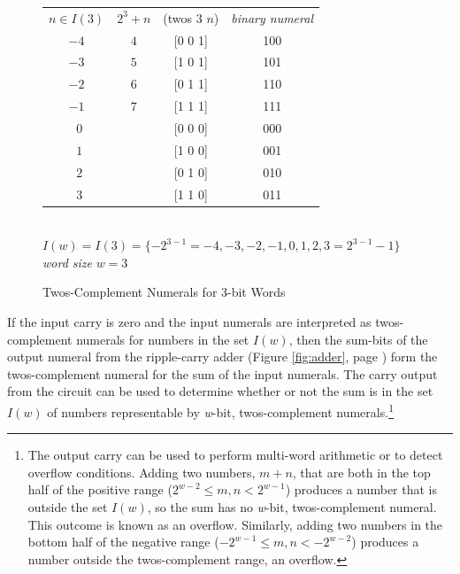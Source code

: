 \begin{figure}
\begin{center}
\begin{tabular}{cccc}
 $n \in I(3)$ & $2^3+n$  & (twos $3$ $n$)   & \emph{binary numeral} \\
 $-4$         & $4$      & [0 0 1]          & 100                   \\
 $-3$         & $5$      & [1 0 1]          & 101                   \\
 $-2$         & $6$      & [0 1 1]          & 110                   \\
 $-1$         & $7$      & [1 1 1]          & 111                   \\
 $~~0$        &          & [0 0 0]          & 000                   \\
 $~~1$        &          & [1 0 0]          & 001                   \\
 $~~2$        &          & [0 1 0]          & 010                   \\
 $~~3$        &          & [1 1 0]          & 011                   \\
\end{tabular}
\\ $I(w) = I(3) = \{-2^{3-1}=-4, -3, -2, -1, 0, 1, 2, 3=2^{3-1}-1\}$
\\ \emph{word size} $w = 3$
\end{center}
\caption{Twos-Complement Numerals for 3-bit Words}
\label{fig:2s-comp-3bit}
\end{figure}

If the input carry is zero and
the input numerals are interpreted
as twos-complement numerals for numbers in the set $I(w)$,
then the sum-bits of the output numeral from the ripple-carry adder
(Figure \ref{fig:adder}, page \pageref{fig:adder})
form the twos-complement numeral for the sum of the input numerals.
The carry output from the circuit can be used to determine
whether or not the sum is in the set $I(w)$ of numbers representable
by \emph{w}-bit, twos-complement numerals.\footnote{The
output carry can be used to perform multi-word arithmetic
or to detect overflow conditions. Adding two numbers, $m+n$,
that are both in the top half of the positive range
($2^{w-2} \leq m, n < 2^{w-1}$) produces a number that is
outside the set $I(w)$, so the sum has no \emph{w}-bit, twos-complement numeral.
This outcome is known as an overflow.
Similarly, adding two numbers in the bottom half of the
negative range ($-2^{w-1} \leq m,n < -2^{w-2}$)
produces a number outside the twos-complement range, an overflow.}

